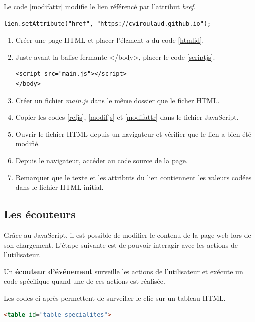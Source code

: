 \documentclass[a4paper,11pt]{article}
\begin{document}
\begin{Form}
Le code \ref{modifattr} modifie le lien référencé par l'attribut \emph{href}.
\begin{code}[!h]
\begin{lstlisting}
lien.setAttribute("href", "https://cviroulaud.github.io");
\end{lstlisting}
\label{modifattr}
\end{code}

\begin{activite}
\begin{enumerate}
\item Créer une page HTML et placer l'élément \emph{a} du code \ref{htmlid}.
\item Juste avant la balise fermante </body>, placer le code \ref{scriptjs}.
\begin{center}
\begin{lstlisting}
<script src="main.js"></script>
</body>
\end{lstlisting}
\label{scriptjs}
\end{center}
\item Créer un fichier \emph{main.js} dans le même dossier que le ficher HTML.
\item Copier les codes \ref{refjs}, \ref{modifjs} et \ref{modifattr} dans le fichier JavaScript.
\item Ouvrir le fichier HTML depuis un navigateur et vérifier que le lien a bien été modifié.
\item Depuis le navigateur, accéder au code source de la page.
\item Remarquer que le texte et les attributs du lien contiennent les valeurs codées dans le fichier HTML initial.
\end{enumerate}
\end{activite}
\subsection{Les écouteurs}
Grâce au JavaScript, il est possible de modifier le contenu de la page web lors de son chargement. L'étape suivante est de pouvoir interagir avec les actions de l'utilisateur.
\begin{aretenir}[]
Un  \textbf{écouteur d'événement} surveille les actions de l'utilisateur et exécute un code spécifique quand une de ces actions est réalisée.
\end{aretenir}

Les codes ci-après permettent de surveiller le clic sur un tableau HTML. 
\begin{center}
\begin{lstlisting}[language=HTML]
<table id="table-specialites">
\end{lstlisting}
\label{moncode}
\end{center}


\end{Form}
\end{document}
